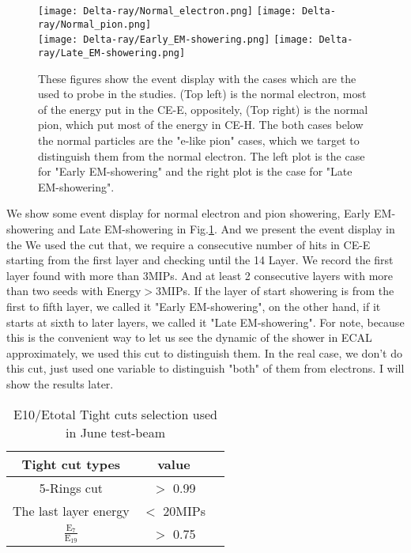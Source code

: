 \documentclass[12pt,twoside,a4paper,an,final]{cms-tdr}
\begin{document}
\begin{figure}[!htb]
\centering
     \texttt{[image: Delta-ray/Normal\_electron.png]}
     \texttt{[image: Delta-ray/Normal\_pion.png]}\\
     \texttt{[image: Delta-ray/Early\_EM-showering.png]}
     \texttt{[image: Delta-ray/Late\_EM-showering.png]}
\caption{These figures show the event display with the cases which are the used to probe in the studies. (Top left) is the normal electron, most of the energy put in the CE-E, oppositely, (Top right) is the normal pion, which put most of the energy in CE-H. The both cases below the normal particles are the "e-like pion" cases, which we target to distinguish them from the normal electron. The left plot is the case for "Early EM-showering" and the right plot is the case for "Late  EM-showering".}
\label{Event_display}
\end{figure}

We show some event display for normal electron and pion showering, Early EM-showering and Late EM-showering in Fig.\ref{Event_display}. And we present the event display in the We used the cut that, we require a consecutive number of hits in CE-E starting from the first layer and checking until the 14 Layer. We record the first layer found with more than 3MIPs. And at least 2 consecutive layers with more than two seeds with Energy$>$3MIPs. If the layer of start showering is from the first to fifth layer, we called it "Early EM-showering", on the other hand, if it starts at sixth to later layers, we called it "Late EM-showering". For note, because this is the convenient way to let us see the dynamic of the shower in ECAL approximately, we used this cut to distinguish them. In the real case, we don't do this cut, just used one variable to distinguish "both" of them from electrons. I will show the results later. 

\begin{table}[h]%
    \centering
    \begin{tabular}{|c|c|c|}
    \hline
    Tight cut types & value\\\hline
    5-Rings cut &  $>$ 0.99 \\\hline  
    The last layer energy & $<$ 20MIPs \\\hline  
   $\mathrm{\frac{E_{7}}{E_{19}}}$& $>$ 0.75\\\hline  
        \end{tabular}
    \caption{E10/Etotal Tight cuts selection used in June test-beam}\label{basic_1}  %
\end{table}
\end{document}
